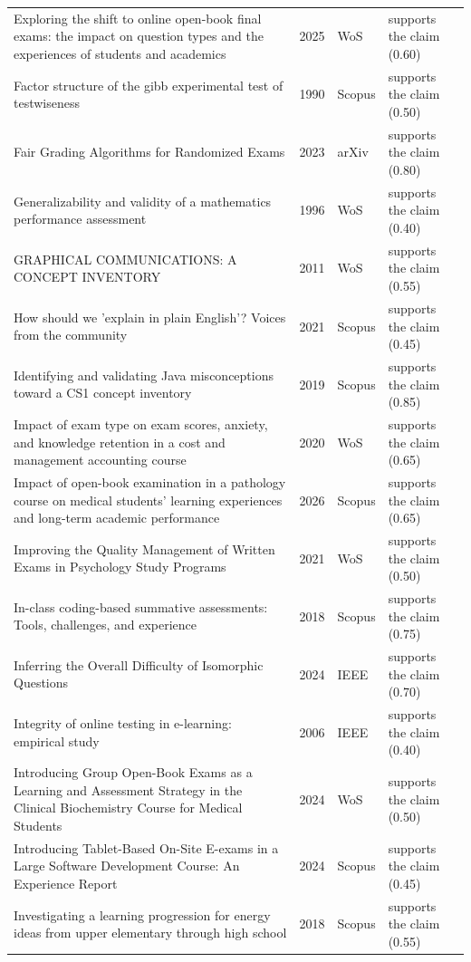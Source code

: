 \begin{longtable}{@{}%
  >{\raggedright\arraybackslash}p{}c%
  >{\raggedright\arraybackslash}p{}%
  >{\raggedright\arraybackslash}p{}@{}}
Exploring the shift to online open-book final exams: the impact on question types and the experiences of students and academics & 2025 & WoS & supports the claim (0.60) \\
Factor structure of the gibb experimental test of testwiseness & 1990 & Scopus & supports the claim (0.50) \\
Fair Grading Algorithms for Randomized Exams & 2023 & arXiv & supports the claim (0.80) \\
Generalizability and validity of a mathematics performance assessment & 1996 & WoS & supports the claim (0.40) \\
GRAPHICAL COMMUNICATIONS: A CONCEPT INVENTORY & 2011 & WoS & supports the claim (0.55) \\
How should we 'explain in plain English'? Voices from the community & 2021 & Scopus & supports the claim (0.45) \\
Identifying and validating Java misconceptions toward a CS1 concept inventory & 2019 & Scopus & supports the claim (0.85) \\
Impact of exam type on exam scores, anxiety, and knowledge retention in a cost and management accounting course & 2020 & WoS & supports the claim (0.65) \\
Impact of open-book examination in a pathology course on medical students' learning experiences and long-term academic performance & 2026 & Scopus & supports the claim (0.65) \\
Improving the Quality Management of Written Exams in Psychology Study Programs & 2021 & WoS & supports the claim (0.50) \\
In-class coding-based summative assessments: Tools, challenges, and experience & 2018 & Scopus & supports the claim (0.75) \\
Inferring the Overall Difficulty of Isomorphic Questions & 2024 & IEEE & supports the claim (0.70) \\
Integrity of online testing in e-learning: empirical study & 2006 & IEEE & supports the claim (0.40) \\
Introducing Group Open-Book Exams as a Learning and Assessment Strategy in the Clinical Biochemistry Course for Medical Students & 2024 & WoS & supports the claim (0.50) \\
Introducing Tablet-Based On-Site E-exams in a Large Software Development Course: An Experience Report & 2024 & Scopus & supports the claim (0.45) \\
Investigating a learning progression for energy ideas from upper elementary through high school & 2018 & Scopus & supports the claim (0.55) \\

\end{longtable}
